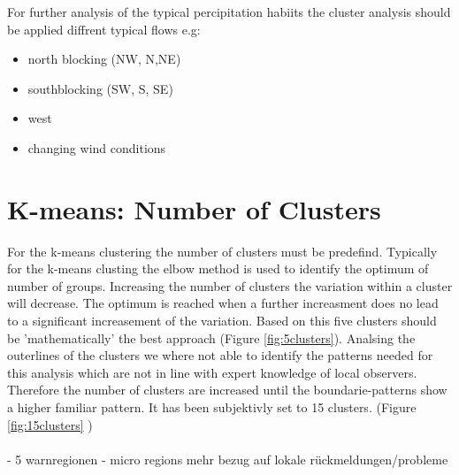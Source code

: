 For further analysis of the typical percipitation habiits the cluster analysis should be applied diffrent typical
flows e.g:
\begin{itemize}
    \item north blocking (NW, N,NE)
    \item southblocking (SW, S, SE)
    \item west
    \item changing wind conditions
\end{itemize} 

\section{K-means: Number of Clusters}

\noindent For the k-means clustering the number of clusters must be predefind. Typically for the k-means clusting the 
elbow method is used to identify the optimum of number of groups. Increasing the number of clusters the
variation within a cluster will decrease. The optimum is reached when a further increasment does no lead to 
a significant increasement of the variation. Based on this five clusters should be 'mathematically' the best 
approach (Figure \ref{fig:5clusters}). Analsing the outerlines of the clusters we where not able to identify the 
patterns needed for this analysis which are not in line with expert knowledge of local observers. Therefore 
the number of clusters are increased until the boundarie-patterns show a higher familiar pattern. It has 
been subjektivly set to 15 clusters. (Figure \ref{fig:15clusters} )
\\
\\

- 5 warnregionen
- micro regions mehr bezug auf lokale rückmeldungen/probleme

